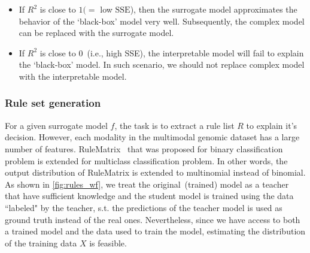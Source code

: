 \begin{itemize}[noitemsep]
    \item If $R^2$ is close to $1(=$ low $\mathrm{SSE}$), then the surrogate model approximates the behavior of the `black-box' model very well. Subsequently, the complex model can be replaced with the surrogate model. 
    \item If $R^2$ is close to 0~(i.e., high SSE), the interpretable model will fail to explain the `black-box' model. In such scenario, we should not replace  complex model with the interpretable model.
\end{itemize}

\subsubsection{Rule set generation}
For a given surrogate model ${f}$, the task is to extract a rule list $R$ to explain it's decision. However, each modality in the multimodal genomic dataset has a large number of features. RuleMatrix~\cite{ming2018rulematrix} that was proposed for binary classification problem is extended for multiclass classification problem. In other words, the output distribution of RuleMatrix is extended to multinomial instead of binomial. 
As shown in \cref{fig:rules_wf}, we treat the original~(trained) model as a teacher that have sufficient knowledge and the student model is trained using the data ``labeled" by the teacher, s.t. the predictions of the teacher model is used as ground truth instead of the real ones. Nevertheless, since we have access to both a trained model and the data used to train the model, estimating the distribution of the training data ${X}$ is feasible. 

